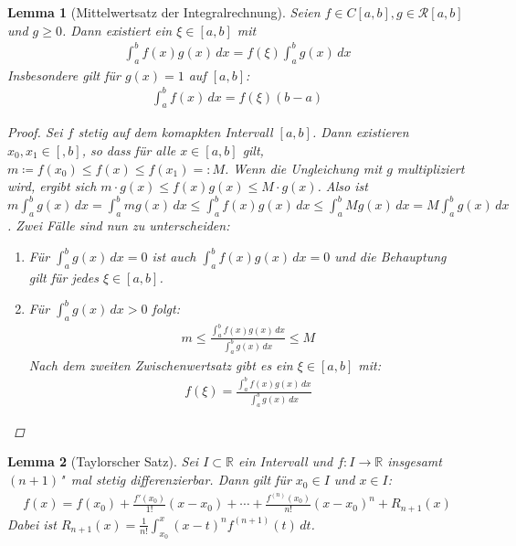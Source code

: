 \documentclass[ngerman,titlepage,twoside, parskip=half*]{scrreprt}
\newcommand*{\R}{\mathbb{R}}
\newcommand*{\RR}{\mathcal{R}}
\theoremstyle{break}
\newtheorem{lemma}{Lemma}
\theoremstyle{nonumberbreak}
\newtheorem{proof}{Beweis:}
\begin{document}
\begin{lemma}[Mittelwertsatz der Integralrechnung]
  Seien $f\in C[a,b], g\in\RR[a,b]$ und $g\geq0$. Dann existiert ein
  $\xi\in[a,b]$ mit
  \begin{gather*}
    \int_{a}^{b} f(x)g(x)\,dx= f(\xi)\int_{a}^{b} g(x)\,dx
  \end{gather*}
  Insbesondere gilt für $g(x)=1$ auf $[a,b]$:
  \begin{gather*}
    \int_{a}^{b} f(x)\,dx= f(\xi)(b-a)
  \end{gather*}
  \begin{proof}
    Sei $f$ stetig auf dem komapkten Intervall $[a,b]$. Dann existieren
    $x_{0}, x_{1}\in[,b]$, so dass für alle $x\in[a,b]$ gilt, $m\coloneqq
    f(x_{0})\leq f(x)\leq f(x_{1})=\colon M$. Wenn die Ungleichung mit $g$
    multipliziert wird, ergibt sich $m\cdot g(x)\leq f(x)g(x)\leq M\cdot
    g(x)$. Also ist $m\int_{a}^{b} g(x)\,dx= \int_{a}^{b} mg(x)\,dx\leq
    \int_{a}^{b} f(x)g(x)\,dx\leq\int_{a}^{b} Mg(x)\,dx= M\int_{a}^{b}
    g(x)\,dx$. Zwei Fälle sind nun zu unterscheiden:
    \begin{enumerate}[1.\,F{a}ll]
     \item Für $\int_{a}^{b} g(x)\,dx=0$ ist auch $\int_{a}^{b}
      f(x)g(x)\,dx=0$ und die Behauptung gilt für jedes $\xi\in[a,b]$.
     \item Für $\int_{a}^{b} g(x)\,dx>0$ folgt:
      \begin{gather*}
	m\leq\frac{\int_{a}^{b} f(x)g(x)\,dx}{\int_{a}^{b} g(x)\,dx}\leq M
      \end{gather*}
      Nach dem zweiten Zwischenwertsatz gibt es ein $\xi\in[a,b]$ mit:
      \begin{gather*}
	f(\xi)= \frac{\int_{a}^{b} f(x)g(x)\,dx}{\int_{a}^{b} g(x)\,dx}
      \end{gather*}
    \end{enumerate}
  \end{proof}
\end{lemma}

\begin{lemma}[Taylorscher Satz]
  Sei $I\subset\R$ ein Intervall und $f\colon I\rightarrow\R$ insgesamt
  $(n+1)$"~mal stetig differenzierbar. Dann gilt für $x_{0}\in I$ und $x\in I$:
  \begin{gather*}
    f(x)= f(x_{0})+
       \frac{f'(x_{0})}{1!}(x-x_{0})+\dotsb+\frac{f^{(n)}(x_{0})}{n!}(x-x_{0})^{n}
       +R_{n+1}(x)
  \end{gather*}
  Dabei ist $R_{n+1}(x)= \frac{1}{n!} \int_{x_{0}}^{x} (x-t)^{n}f^{(n+1)}
  (t)\,dt$.
\end{lemma}
\end{document}
